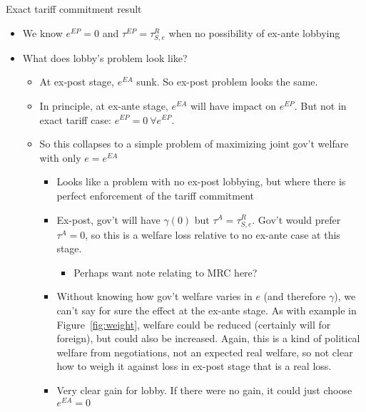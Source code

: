 \documentclass[12pt]{article}
\newcommand{\ga}{\gamma}
\begin{document}
\newpage
Exact tariff commitment result
\begin{itemize}
	\item We know $e^{EP} =0$ and $\tau^{EP} = \tau^R_{S,e}$ when no possibility of ex-ante lobbying
	\item What does lobby's problem look like?
		\begin{itemize}
			\item At ex-post stage, $e^{EA}$ sunk. So ex-post problem looks the same.
			\item In principle, at ex-ante stage, $e^{EA}$ will have impact on $e^{EP}$. But not in exact tariff case: $e^{EP} = 0 \ \forall e^{EP}$.
			\item So this collapses to a simple problem of maximizing joint gov't welfare with only $e=e^{EA}$
				\begin{itemize}
					\item Looks like a problem with no ex-post lobbying, but where there is perfect enforcement of the tariff commitment
					\item Ex-post, gov't will have $\ga(0)$ but $\tau^A = \tau^R_{S,e}$. Gov't would prefer $\tau^A = 0$, so this is a welfare loss relative to no ex-ante case at this stage.
						\begin{itemize}
							\item Perhaps want note relating to MRC here?
						\end{itemize}
					\item Without knowing how gov't welfare varies in $e$ (and therefore $\ga$), we can't say for sure the effect at the ex-ante stage. As with example in Figure~\ref{fig:weight}, welfare could be reduced (certainly will for foreign), but could also be increased. Again, this is a kind of political welfare from negotiations, not an expected real welfare, so not clear how to weigh it against loss in ex-post stage that is a real loss.
					\item Very clear gain for lobby. If there were no gain, it could just choose $e^{EA} = 0$
				\end{itemize}
		\end{itemize}
\end{itemize}
\end{document}
